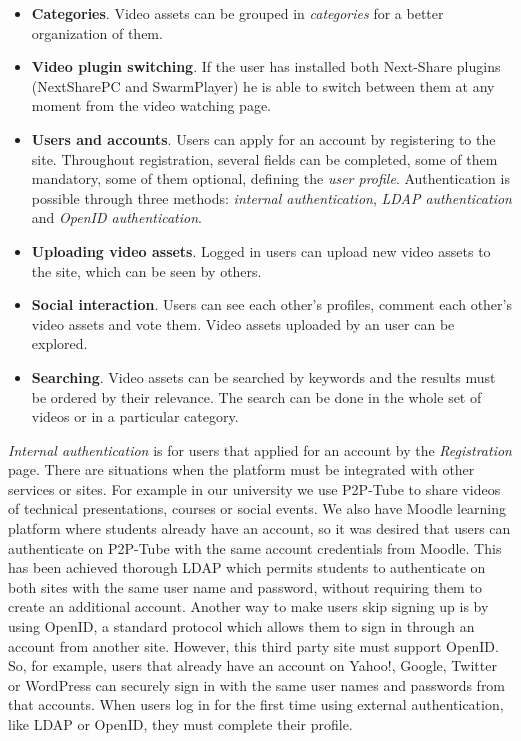 \begin{itemize}
 \item \textbf{Categories}. Video assets can be grouped in \textit{categories} for a better organization of them.
 \item \textbf{Video plugin switching}. If the user has installed both Next-Share plugins (NextSharePC and SwarmPlayer) he is able to switch between them at any moment from the video watching page.
 \item \textbf{Users and accounts}. Users can apply for an account by registering to the site. Throughout registration, several fields can be completed, some of them mandatory, some of them optional, defining the \textit{user profile}. Authentication is possible through three methods: \textit{internal authentication}, \textit{LDAP authentication} and \textit{OpenID authentication}.
 \item \textbf{Uploading video assets}. Logged in users can upload new video assets to the site, which can be seen by others.
 \item \textbf{Social interaction}. Users can see each other's profiles, comment each other's video assets and vote them. Video assets uploaded by an user can be explored.
 \item \textbf{Searching}. Video assets can be searched by keywords and the results must be ordered by their relevance. The search can be done in the whole set of videos or in a particular category.
\end{itemize}

\textit{Internal authentication} is for users that applied for an account by the \textit{Registration} page. There are situations when the platform must be integrated with other services or sites. For example in our university we use P2P-Tube to share videos of technical presentations, courses or social events. We also have Moodle learning platform where students already have an account, so it was desired that users can authenticate on P2P-Tube with the same account credentials from Moodle. This has been achieved thorough LDAP which permits students to authenticate on both sites with the same user name and password, without requiring them to create an additional account. Another way to make users skip signing up is by using OpenID, a standard protocol which allows them to sign in through an account from another site. However, this third party site must support OpenID. So, for example, users that already have an account on Yahoo!, Google, Twitter or WordPress can securely sign in with the same user names and passwords from that accounts. When users log in for the first time using external authentication, like LDAP or OpenID, they must complete their profile.

